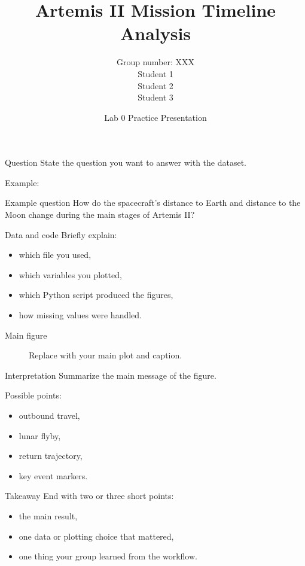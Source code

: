 \documentclass[aspectratio=169]{beamer}
\title{Artemis II Mission Timeline Analysis}
\author[Group XXX]{
  Group number: XXX \\
  Student 1 \\
  Student 2 \\
  Student 3
}
\institute{Modelling Complex Systems, Spring 2026}
\date{Lab 0 Practice Presentation}
\begin{document}
\begin{frame}
  \titlepage
\end{frame}

\begin{frame}{Question}
  State the question you want to answer with the dataset.

  \vspace{0.5em}
  Example:
  \begin{block}{Example question}
    How do the spacecraft's distance to Earth and distance to the Moon change during the main stages of Artemis II?
  \end{block}
\end{frame}

\begin{frame}{Data and code}
  Briefly explain:
  \begin{itemize}
    \item which file you used,
    \item which variables you plotted,
    \item which Python script produced the figures,
    \item how missing values were handled.
  \end{itemize}
\end{frame}

\begin{frame}{Main figure}
  \begin{figure}
    \centering
    \caption{Replace with your main plot and caption.}
  \end{figure}
\end{frame}

\begin{frame}{Interpretation}
  Summarize the main message of the figure.

  \vspace{0.5em}
  Possible points:
  \begin{itemize}
    \item outbound travel,
    \item lunar flyby,
    \item return trajectory,
    \item key event markers.
  \end{itemize}
\end{frame}

\begin{frame}{Takeaway}
  End with two or three short points:
  \begin{itemize}
    \item the main result,
    \item one data or plotting choice that mattered,
    \item one thing your group learned from the workflow.
  \end{itemize}
\end{frame}
\end{document}
